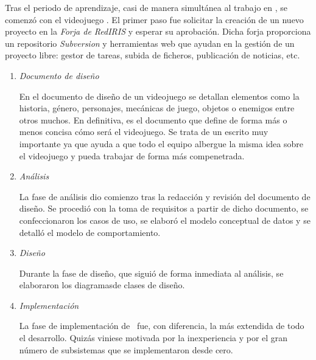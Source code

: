 \begin{enumerate}
    Tras el periodo de aprendizaje, casi de manera simultánea al trabajo
    en \wiki, se comenzó con el videojuego \juego. El primer paso fue solicitar
    la creación de un nuevo proyecto en la \textit{Forja de RedIRIS} y 
    esperar su aprobación. Dicha forja proporciona un repositorio
    \textit{Subversion} y herramientas web que ayudan en la gestión de
    un proyecto libre: gestor de tareas, subida de ficheros, publicación
    de noticias, etc.
    
    \begin{enumerate}
        \itemsep0em
        \item \textit{Documento de diseño}
        
        En el documento de diseño de un videojuego se detallan elementos
        como la historia, género, personajes, mecánicas de juego, objetos
        o enemigos entre otros muchos. En definitiva, es el documento
        que define de forma más o menos concisa cómo será el videojuego.
        Se trata de un escrito muy importante ya que ayuda a que todo el
        equipo albergue la misma idea sobre el videojuego y pueda trabajar
        de forma más compenetrada.\\
        
        \item \textit{Análisis}
        
        La fase de análisis dio comienzo tras la redacción y revisión del
        documento de diseño. Se procedió con la toma de requisitos a partir
        de dicho documento, se confeccionaron los casos de uso, se elaboró
        el modelo conceptual de datos y se detalló el modelo de comportamiento.\\
        
        \item \textit{Diseño}
        
        Durante la fase de diseño, que siguió de forma inmediata al análisis,
        se elaboraron los diagramasde clases de diseño.\\
        
        \item \textit{Implementación}
        
        La fase de implementación de \juego\ fue, con diferencia, la más
        extendida de todo el desarrollo. Quizás viniese motivada por
        la inexperiencia y por el gran número de subsistemas que se implementaron
        desde cero.\\
        

\end{enumerate}
\end{enumerate}
